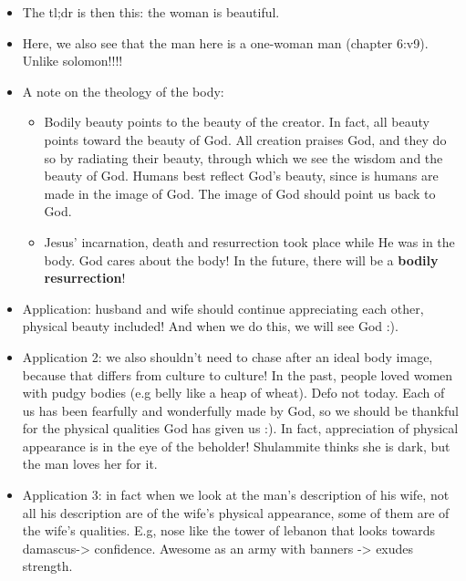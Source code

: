\begin{itemize}
  \item{The tl;dr is then this: the woman is beautiful.}
  \item{Here, we also see that the man here is a one-woman man (chapter 6:v9). Unlike solomon!!!!}
  \item{A note on the theology of the body:
  \begin{itemize}
    \item{Bodily beauty points to the beauty of the creator. In fact, all beauty points toward the beauty of God. All creation praises God, and they do so by radiating their beauty, through which we see the wisdom and the beauty of God. Humans best reflect God’s beauty, since is humans are made in the image of God. The image of God should point us back to God.}
    \item{Jesus’ incarnation, death and resurrection took place while He was in the body. God cares about the body! In the future, there will be a \textbf{bodily resurrection}!}
  \end{itemize}}
  \item{Application: husband and wife should continue appreciating each other, physical beauty included! And when we do this, we will see God :).}
  \item{Application 2: we also shouldn’t need to chase after an ideal body image, because that differs from culture to culture! In the past, people loved women with pudgy bodies (e.g belly like a heap of wheat). Defo not today. Each of us has been fearfully and wonderfully made by God, so we should be thankful for the physical qualities God has given us :). In fact, appreciation of physical appearance is in the eye of the beholder! Shulammite thinks she is dark, but the man loves her for it.}
  \item{Application 3: in fact when we look at the man’s description of his wife, not all his description are of the wife’s physical appearance, some of them are of the wife’s qualities. E.g, nose like the tower of lebanon that looks towards damascus-> confidence. Awesome as an army with banners -> exudes strength. }
\end{itemize}
